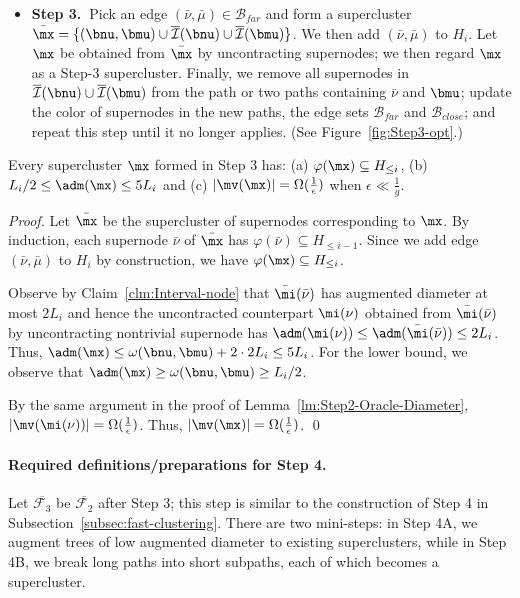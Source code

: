 \begin{itemize}
	\item \textbf{Step 3.~}Pick an edge $ (\bar\nu,\bar\mu) \in \mathcal{B}_{far}$
	and form a supercluster $\bar{\mx} = \{(\bnu,\bmu)\cup \overline{\mathcal{I}}(\bnu) \cup \overline{\mathcal{I}}(\bmu)\}$.  We then add  $(\bar\nu,\bar\mu)$ to $H_i$. Let $\mx$ be obtained from $\bar{\mx}$ by uncontracting supernodes; we then regard $\mx$ as a Step-3 supercluster. Finally, we remove  all supernodes in  $\overline{\mathcal{I}}(\bnu) \cup \overline{\mathcal{I}}(\bmu)$ from the path or two paths containing $\bar\nu$ and $\bmu$; update the color of  supernodes in the new paths,  the edge sets $\mathcal{B}_{far}$ and  $\mathcal{B}_{close}$; and repeat this step until it no longer applies. (See Figure~\ref{fig:Step3-opt}.)
\end{itemize}


\begin{lemma}\label{lm:Step3-Diam-Oracle}
	Every supercluster $\mx$ formed in Step 3 has: (a) $\varphi(\mx)\subseteq H_{\leq i}$, (b) $L_i/2 \leq \adm(\mx)\leq 5L_i$  and (c) $|\mv(\mx)| = \Omega(\frac{1}{\epsilon})$ when $\epsilon \ll \frac{1}{g}$.
\end{lemma}
\begin{proof}
	Let $\bar{\mx}$ be the supercluster of supernodes corresponding to $\mx$.  By induction, each supernode $\bar{\nu}$ of $\bar{\mx}$ has $\varphi(\bar{\nu}) \subseteq H_{\leq i-1}$. Since we add edge $(\bar{\nu},\bar{\mu})$ to $H_i$ by construction, we have $\varphi(\mx)\subseteq H_{\leq i}$. 
	
	Observe by Claim~\ref{clm:Interval-node}  that $\bar{\mi}(\bar{\nu})$ has augmented diameter at most $2L_i$ and hence the uncontracted counterpart $\mi(\nu)$ obtained from $\bar{\mi}(\bar{\nu})$ by uncontracting nontrivial supernode has $\adm(\mi(\nu)) \leq \adm(\bar{\mi}(\bar{\nu}))\leq 2L_i$. Thus, $\adm(\mx) \leq \omega(\bnu,\bmu) + 2\cdot 2L_i \leq 5L_i$.	For the lower bound, we observe that $\adm(\mx)\geq \omega(\bnu,\bmu) \geq L_i/2$. 
	
By the same argument in the proof of Lemma~\ref{lm:Step2-Oracle-Diameter}, $|\mv(\mi(\nu))|  = \Omega(\frac{1}{\epsilon})$. Thus, $|\mv(\mx)| = \Omega(\frac{1}{\epsilon})$.	\qed
\end{proof}


\paragraph{Required definitions/preparations for Step 4.~}   Let $\overline{\mathcal{F}_3}$ be $\overline{\mathcal{F}_2}$ after Step 3; this step is similar to the construction of Step 4 in Subsection~\ref{subsec:fast-clustering}. There are two mini-steps: in Step 4A, we augment trees of low augmented diameter to existing superclusters, while in Step 4B, we break long paths into short subpaths, each of which becomes a supercluster.



